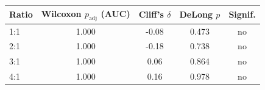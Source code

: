 \begin{tabular}{lcccc}
\toprule
Ratio & Wilcoxon $p_{\text{adj}}$ (AUC) & Cliff's $\delta$ & DeLong $p$ & Signif. \\
\midrule
1:1 & 1.000 & -0.08 & 0.473 & no \\
2:1 & 1.000 & -0.18 & 0.738 & no \\
3:1 & 1.000 & 0.06 & 0.864 & no \\
4:1 & 1.000 & 0.16 & 0.978 & no \\
\bottomrule
\end{tabular}